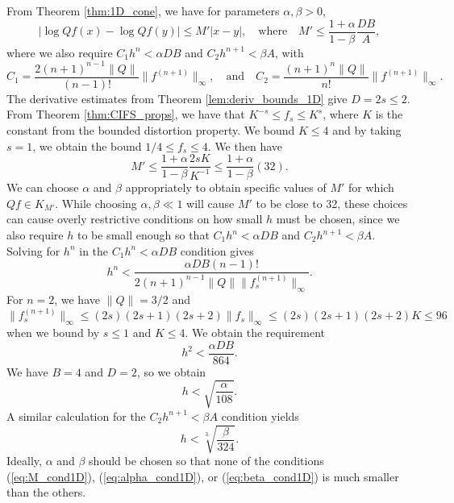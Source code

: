 \documentclass[10pt]{article}
\theoremstyle{definition}
\numberwithin{equation}{section}
\numberwithin{figure}{section}
\numberwithin{table}{section}
\begin{document}
From Theorem \ref{thm:1D_cone}, we have for parameters $\alpha,\beta>0$,
$$|\log Qf(x)-\log Qf(y)|\leq M'|x-y|,\quad\text{where}\quad M'\leq\frac{1+\alpha}{1-\beta}\frac{DB}{A},$$
where we also require $C_1h^n<\alpha DB$ and $C_2h^{n+1}<\beta A$, with
$$C_1=\frac{2(n+1)^{n-1}\|Q\|}{(n-1)!}\|f^{(n+1)}\|_\infty,\quad\text{and}\quad C_2=\frac{(n+1)^n\|Q\|}{n!}\|f^{(n+1)}\|_\infty.$$
The derivative estimates from Theorem \ref{lem:deriv_bounds_1D} give $D=2s\leq 2$. From Theorem \ref{thm:CIFS_props}, we have that $K^{-s}\leq f_s\leq K^s$, where $K$ is the constant from the bounded distortion property. We bound $K\leq 4$ and by taking $s=1$, we obtain the bound $1/4\leq f_s\leq 4$. We then have %
$$M'\leq\frac{1+\alpha}{1-\beta}\frac{2sK}{K^{-1}}\leq \frac{1+\alpha}{1-\beta}(32).$$
We can choose $\alpha$ and $\beta$ appropriately to obtain specific values of $M'$ for which $Qf\in K_{M'}$. While choosing $\alpha,\beta\ll1$ will cause $M'$ to be close to 32, these choices can cause overly restrictive conditions on how small $h$ must be chosen,
since we also require $h$ to be small enough so that $C_1h^n<\alpha DB$ and $C_2h^{n+1}<\beta A$. Solving for $h^n$ in the $C_1h^n<\alpha DB$ condition gives
$$h^n<\frac{\alpha DB(n-1)!}{2(n+1)^{n-1}\|Q\|\|f_s^{(n+1)}\|_\infty}.$$
For $n=2$, we have $\|Q\|=3/2$ and $\|f_s^{(n+1)}\|_\infty\leq (2s)(2s+1)(2s+2)\|f_s\|_\infty\leq (2s)(2s+1)(2s+2)K\leq96$ when we bound by $s\leq1$ and $K\leq 4$. We obtain the requirement
$$h^2<\frac{\alpha DB}{864}.$$%
We have $B=4$ and $D=2$, so we obtain
\begin{equation}
h<\sqrt{\frac{\alpha}{108}}.
\label{eq:alpha_cond1D}
\end{equation}
A similar calculation for the $C_2h^{n+1}<\beta A$ condition yields
\begin{equation}
h<\sqrt[3]{\frac{\beta}{324}}.
\label{eq:beta_cond1D}
\end{equation}
Ideally, $\alpha$ and $\beta$ should be chosen so that none of the conditions (\ref{eq:M_cond1D}), (\ref{eq:alpha_cond1D}), or (\ref{eq:beta_cond1D}) is much smaller than the others.
\end{document}
